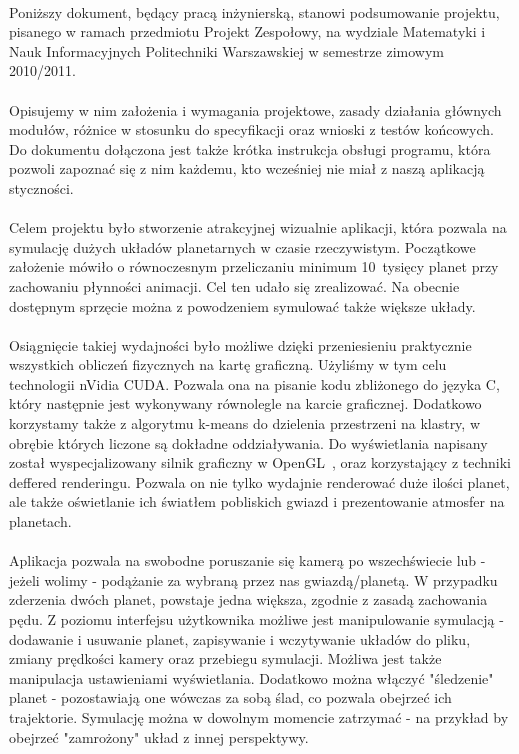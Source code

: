 \paragraph{}
Poniższy dokument, będący pracą inżynierską, stanowi podsumowanie projektu, pisanego w ramach przedmiotu Projekt Zespołowy, na wydziale Matematyki i Nauk Informacyjnych Politechniki Warszawskiej w semestrze zimowym 2010/2011.

\paragraph{}
Opisujemy w nim założenia i wymagania projektowe, zasady działania głównych modułów, różnice w stosunku do specyfikacji oraz wnioski z testów końcowych. Do dokumentu dołączona jest także krótka instrukcja obsługi programu, która pozwoli zapoznać się z nim każdemu, kto wcześniej nie miał z naszą aplikacją styczności.

\paragraph{}
Celem projektu było stworzenie atrakcyjnej wizualnie aplikacji, która pozwala na symulację dużych układów planetarnych w czasie rzeczywistym. Początkowe założenie mówiło o równoczesnym przeliczaniu minimum 10~tysięcy planet przy zachowaniu płynności animacji. Cel ten udało się zrealizować. Na obecnie dostępnym sprzęcie można z powodzeniem symulować także większe układy.

\paragraph{}
Osiągnięcie takiej wydajności było możliwe dzięki przeniesieniu praktycznie wszystkich obliczeń fizycznych na kartę graficzną. Użyliśmy w tym celu technologii nVidia CUDA\cite{cuda}. Pozwala ona na pisanie kodu zbliżonego do języka C, który następnie jest wykonywany równolegle na karcie graficznej. Dodatkowo korzystamy także z algorytmu k-means do dzielenia przestrzeni na klastry, w obrębie których liczone są dokładne oddziaływania. Do wyświetlania napisany został wyspecjalizowany silnik graficzny w OpenGL~\cite{ogl:bible}, oraz korzystający z techniki deffered renderingu. Pozwala on nie tylko wydajnie renderować duże ilości planet, ale także oświetlanie ich światłem pobliskich gwiazd i prezentowanie atmosfer na planetach.

\paragraph{}
Aplikacja pozwala na swobodne poruszanie się kamerą po wszechświecie lub - jeżeli wolimy - podążanie za wybraną przez nas gwiazdą/planetą. W przypadku zderzenia dwóch planet, powstaje jedna większa, zgodnie z zasadą zachowania pędu. Z poziomu interfejsu użytkownika możliwe jest manipulowanie symulacją - dodawanie i usuwanie planet, zapisywanie i wczytywanie układów do pliku, zmiany prędkości kamery oraz przebiegu symulacji. Możliwa jest także manipulacja ustawieniami wyświetlania. Dodatkowo można włączyć "śledzenie" planet - pozostawiają one wówczas za sobą ślad, co pozwala obejrzeć ich trajektorie. Symulację można w dowolnym momencie zatrzymać - na przykład by obejrzeć "zamrożony" układ z innej perspektywy.
